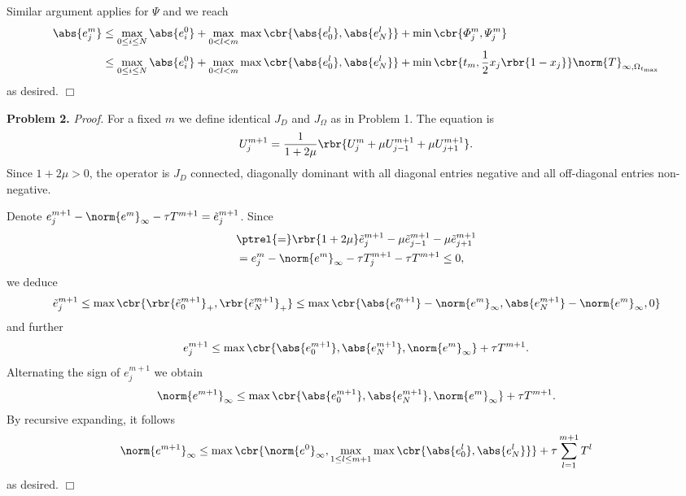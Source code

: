 \documentclass[english, nochinese]{pnote}
\begin{document}
Similar argument applies for $\varPsi$ and we reach
\begin{equation}
\begin{split}
\abs{e_j^m} &\le \max_{ 0 \le i \le N } \abs{e_i^0} + \max_{ 0 < l < m } \max \cbr{ \abs{e_0^l}, \abs{e_N^l} } + \min \cbr{ \varPhi_j^m, \varPsi_j^m } \\
&\le \max_{ 0 \le i \le N } \abs{e_i^0} + \max_{ 0 < l < m } \max \cbr{ \abs{e_0^l}, \abs{e_N^l} } + \min \cbr{ t_m, \frac{1}{2} x_j \rbr{ 1 - x_j } } \norm{T}_{ \infty, \Omega_{t_{\text{max}}} }
\end{split}
\end{equation}
as desired.
\hfill$\Box$

\textbf{Problem 2.} \textit{Proof.} For a fixed $m$ we define identical $J_D$ and $J_{\Omega}$ as in Problem 1. The equation is
\begin{equation}
U_j^{ m + 1 } = \frac{1}{ 1 + 2 \mu } \rbr{ U_j^m + \mu U_{ j - 1 }^{ m + 1 } + \mu U_{ j + 1 }^{ m + 1 } }.
\end{equation}
Since $ 1 + 2 \mu > 0 $, the operator is $J_D$ connected, diagonally dominant with all diagonal entries negative and all off-diagonal entries non-negative.

Denote $ e_j^{ m + 1 } - \norm{e^m}_{\infty} - \tau T^{ m + 1 } = \tilde{e}_j^{ m + 1 } $. Since
\begin{equation}
\begin{split}
&\ptrel{=} \rbr{ 1 + 2 \mu } \tilde{e}_j^{ m + 1 } - \mu \tilde{e}_{ j - 1 }^{ m + 1 } - \mu \tilde{e}_{ j + 1 }^{ m + 1 } \\
&= e_j^m - \norm{e^m}_{\infty} - \tau T_j^{ m + 1 } - \tau T^{ m + 1 } \le 0,
\end{split}
\end{equation}
we deduce
\begin{equation}
\tilde{e}_j^{ m + 1 } \le \max \cbr{ \rbr{ \tilde{e}_0^{ m + 1 } }_+, \rbr{ \tilde{e}_N^{ m + 1 } }_+ } \le \max \cbr{ \abs{e_0^{ m + 1 }} - \norm{e^m}_{\infty}, \abs{e_N^{ m + 1 }} - \norm{e^m}_{\infty}, 0 }
\end{equation}
and further 
\begin{equation}
e_j^{ m + 1 } \le \max \cbr{ \abs{e_0^{ m + 1 }}, \abs{e_N^{ m + 1 }}, \norm{e^m}_{\infty} } + \tau T^{ m + 1 }.
\end{equation}
Alternating the sign of $ e_j^{ m + 1 } $ we obtain
\begin{equation}
\norm{e^{ m + 1 }}_{\infty} \le \max \cbr{ \abs{e_0^{ m + 1 }}, \abs{e_N^{ m + 1 }}, \norm{e^m}_{\infty} } + \tau T^{ m + 1 }.
\end{equation}
By recursive expanding, it follows
\begin{equation}
\norm{e^{ m + 1 }}_{\infty} \le \max \cbr{ \norm{e^0}_{\infty}, \max_{ 1 \le l \le m + 1 } \max \cbr{ \abs{e_0^l}, \abs{e_N^l} } } + \tau \sum_{ l = 1 }^{ m + 1 } T^l
\end{equation}
as desired.
\hfill$\Box$
\end{document}
